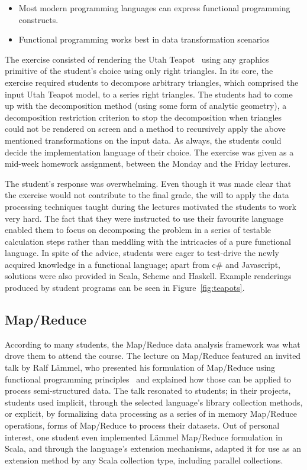 \documentclass[conference]{IEEEtran}
\begin{document}
\begin{itemize}

  \item Most modern programming languages can express functional programming
    constructs.

  \item Functional programming works best in data transformation scenarios

\end{itemize}

The exercise consisted of rendering the Utah Teapot~\cite{Torre06} using any
graphics primitive of the student's choice using only right triangles.  In its
core, the exercise required students to decompose arbitrary triangles, which
comprised the input Utah Teapot model, to a series right triangles. The students
had to come up with the decomposition method (using some form of analytic
geometry), a decomposition restriction criterion to stop the decomposition when
triangles could not be rendered on screen and a method to recursively apply the
above mentioned transformations on the input data. As always, the students could
decide the implementation language of their choice. The exercise was given as a
mid-week homework assignment, between the Monday and the Friday lectures.

The student's response was overwhelming. Even though it was made clear that the
exercise would not contribute to the final grade, the will to apply the data
processing techniques taught during the lectures motivated the students to work
very hard. The fact that they were instructed to use their favourite language
enabled them to focus on decomposing the problem in a series of testable
calculation steps rather than meddling with the intricacies of a pure functional
language. In spite of the advice, students were eager to test-drive the newly
acquired knowledge in a functional language; apart from {\sc c\#} and
Javascript, solutions were also provided in Scala, Scheme and Haskell. Example
renderings produced by student programs can be seen in Figure~\ref{fig:teapots}.

\subsection{Map/Reduce}

According to many students, the Map/Reduce data analysis framework was what
drove them to attend the course. The lecture on Map/Reduce featured an invited
talk by Ralf L\"ammel, who presented his formulation of Map/Reduce using
functional programming principles~\cite{Lamme08} and explained how those can be
applied to process semi-structured data. The talk resonated to students; in
their projects, students used implicit, through the selected language's library
collection methods, or explicit, by formalizing data processing as a series of
in memory Map/Reduce operations, forms of Map/Reduce to process their datasets.
Out of personal interest, one student even implemented L\"ammel Map/Reduce
formulation in Scala, and through the language's extension mechanisms, adapted
it for use as an extension method by any Scala collection type, including
parallel collections. 
\end{document}
